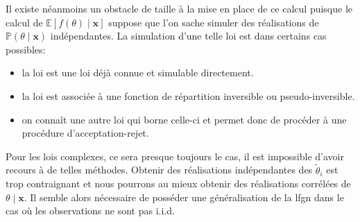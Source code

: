 Il existe néanmoins un obstacle de taille à la mise en place de ce calcul puisque le calcul de $\mathbb{E} \left[ f(\theta) \mid \mathbf{x} \right]$ suppose que l'on sache simuler des réalisations de $\mathbb{P} ( \theta \mid \mathbf{x} )$ indépendantes. La simulation d'une telle loi est dans certains cas possibles:
\begin{itemize}
    \item la loi est une loi déjà connue et simulable directement.
    \item la loi est associée à une fonction de répartition inversible ou pseudo-inversible.
    \item on connaît une autre loi qui borne celle-ci et permet donc de procéder à une procédure d'acceptation-rejet.
\end{itemize}

Pour les lois complexes, ce sera presque toujours le cas, il est impossible d'avoir recours à de telles méthodes. Obtenir des réalisations indépendantes des $\tilde{\theta}_i$ est trop contraignant et nous pourrons au mieux obtenir des réalisations corrélées de $\theta \mid \mathbf{x}$. Il semble alors nécessaire de posséder une généralisation de la \ac{lfgn} dans le cas où les observations ne sont pas i.i.d.

